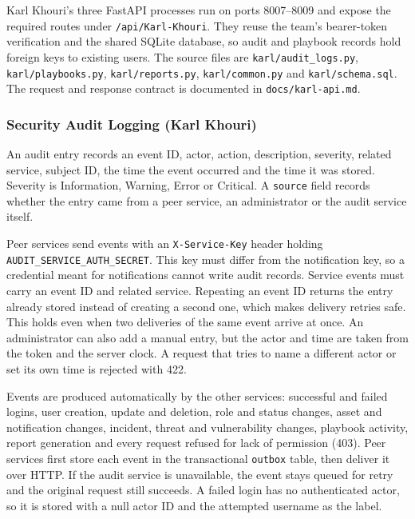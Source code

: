 Karl Khouri's three FastAPI processes run on ports 8007--8009 and expose the required routes under \texttt{/api/Karl-Khouri}. They reuse the team's bearer-token verification and the shared SQLite database, so audit and playbook records hold foreign keys to existing users. The source files are \texttt{karl/audit\_logs.py}, \texttt{karl/playbooks.py}, \texttt{karl/reports.py}, \texttt{karl/common.py} and \texttt{karl/schema.sql}. The request and response contract is documented in \texttt{docs/karl-api.md}.

\subsubsection{Security Audit Logging (Karl Khouri)}

An audit entry records an event ID, actor, action, description, severity, related service, subject ID, the time the event occurred and the time it was stored. Severity is Information, Warning, Error or Critical. A \texttt{source} field records whether the entry came from a peer service, an administrator or the audit service itself.

Peer services send events with an \texttt{X-Service-Key} header holding \texttt{AUDIT\_SERVICE\_AUTH\_SECRET}. This key must differ from the notification key, so a credential meant for notifications cannot write audit records. Service events must carry an event ID and related service. Repeating an event ID returns the entry already stored instead of creating a second one, which makes delivery retries safe. This holds even when two deliveries of the same event arrive at once. An administrator can also add a manual entry, but the actor and time are taken from the token and the server clock. A request that tries to name a different actor or set its own time is rejected with 422.

Events are produced automatically by the other services: successful and failed logins, user creation, update and deletion, role and status changes, asset and notification changes, incident, threat and vulnerability changes, playbook activity, report generation and every request refused for lack of permission (403). Peer services first store each event in the transactional \texttt{outbox} table, then deliver it over HTTP. If the audit service is unavailable, the event stays queued for retry and the original request still succeeds. A failed login has no authenticated actor, so it is stored with a null actor ID and the attempted username as the label.

